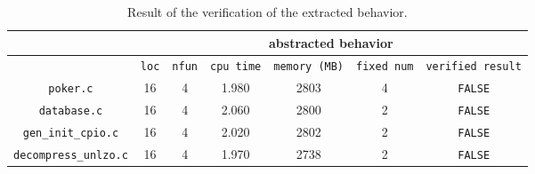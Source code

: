 \begin{table}
  \scriptsize
\begin{tabular}{|c|c|c|c|c|c|c|}
\hline
&\multicolumn{6}{|c|}{abstracted behavior} \\
\hline
 &\texttt{loc} & \texttt{nfun} & \texttt{cpu time} & \texttt{memory (MB)} & \texttt{fixed num} & \texttt{verified result} \\
\hline
\texttt{poker.c} & 16 & 4 & 1.980 & 2803 & 4  & \texttt{FALSE}  \\
\hline
\texttt{database.c} &  16 & 4 & 2.060 & 2800 & 2 & \texttt{FALSE} \\
\hline
\texttt{gen\_init\_cpio.c} & 16 & 4 & 2.020 & 2802 & 2  & \texttt{FALSE}  \\
\hline
\texttt{decompress\_unlzo.c} & 16 & 4 & 1.970  & 2738  & 2  & \texttt{FALSE}  \\
\hline
\end{tabular}
\caption{Result of the verification of the extracted behavior.}
\label{tb:mca}
\end{table}



